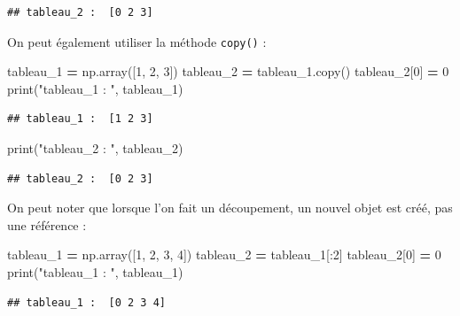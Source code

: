 \documentclass[12pt,]{book}
\newenvironment{Shaded}{\begin{snugshade}}{\end{snugshade}}
\newcommand{\DecValTok}[1]{\textcolor[rgb]{0.00,0.00,0.81}{#1}}
\newcommand{\StringTok}[1]{\textcolor[rgb]{0.31,0.60,0.02}{#1}}
\newcommand{\OperatorTok}[1]{\textcolor[rgb]{0.81,0.36,0.00}{\textbf{#1}}}
\newcommand{\BuiltInTok}[1]{#1}
\newcommand{\NormalTok}[1]{#1}
\numberwithin{equation}{section}
\numberwithin{countremarque}{section}
\begin{document}
\begin{lstlisting}
## tableau_2 :  [0 2 3]
\end{lstlisting}

On peut également utiliser la méthode \texttt{copy()} :

\begin{Shaded}
\begin{Highlighting}[]
\NormalTok{tableau_1 }\OperatorTok{=}\NormalTok{ np.array([}\DecValTok{1}\NormalTok{, }\DecValTok{2}\NormalTok{, }\DecValTok{3}\NormalTok{])}
\NormalTok{tableau_2 }\OperatorTok{=}\NormalTok{ tableau_1.copy()}
\NormalTok{tableau_2[}\DecValTok{0}\NormalTok{] }\OperatorTok{=} \DecValTok{0}
\BuiltInTok{print}\NormalTok{(}\StringTok{"tableau_1 : "}\NormalTok{, tableau_1)}
\end{Highlighting}
\end{Shaded}

\begin{lstlisting}
## tableau_1 :  [1 2 3]
\end{lstlisting}

\begin{Shaded}
\begin{Highlighting}[]
\BuiltInTok{print}\NormalTok{(}\StringTok{"tableau_2 : "}\NormalTok{, tableau_2)}
\end{Highlighting}
\end{Shaded}

\begin{lstlisting}
## tableau_2 :  [0 2 3]
\end{lstlisting}

On peut noter que lorsque l'on fait un découpement, un nouvel objet est
créé, pas une référence :

\begin{Shaded}
\begin{Highlighting}[]
\NormalTok{tableau_1 }\OperatorTok{=}\NormalTok{ np.array([}\DecValTok{1}\NormalTok{, }\DecValTok{2}\NormalTok{, }\DecValTok{3}\NormalTok{, }\DecValTok{4}\NormalTok{])}
\NormalTok{tableau_2 }\OperatorTok{=}\NormalTok{ tableau_1[:}\DecValTok{2}\NormalTok{]}
\NormalTok{tableau_2[}\DecValTok{0}\NormalTok{] }\OperatorTok{=} \DecValTok{0}
\BuiltInTok{print}\NormalTok{(}\StringTok{"tableau_1 : "}\NormalTok{, tableau_1)}
\end{Highlighting}
\end{Shaded}

\begin{lstlisting}
## tableau_1 :  [0 2 3 4]
\end{lstlisting}
\end{document}
